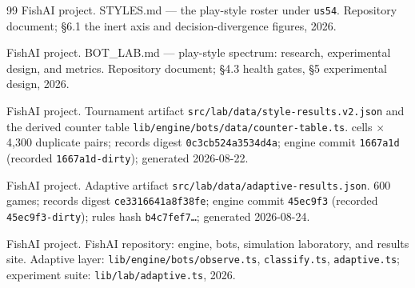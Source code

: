 \documentclass[11pt]{article}
\newcommand{\code}[1]{\texttt{#1}}
\newcommand{\usff}{\code{us54}}
\begin{document}
\begin{thebibliography}{99}
FishAI project.
\newblock STYLES.md --- the play-style roster under \usff{}.
\newblock Repository document; \S6.1 the inert axis and decision-divergence figures, 2026.

FishAI project.
\newblock BOT\_LAB.md --- play-style spectrum: research, experimental design, and metrics.
\newblock Repository document; \S4.3 health gates, \S5 experimental design, 2026.

FishAI project.
\newblock Tournament artifact \code{src/lab/data/style-results.v2.json} and the derived
counter table \code{lib/engine/bots/data/counter-table.ts}.
 cells $\times$ 4{,}300 duplicate pairs; records digest
\code{0c3cb524a3534d4a}; engine commit \code{1667a1d} (recorded \code{1667a1d-dirty});
generated 2026-08-22.

FishAI project.
\newblock Adaptive artifact \code{src/lab/data/adaptive-results.json}.
600 games; records digest \code{ce3316641a8f38fe}; engine commit
\code{45ec9f3} (recorded \code{45ec9f3-dirty}); rules hash \code{b4c7fef7\ldots};
generated 2026-08-24.

FishAI project.
\newblock FishAI repository: engine, bots, simulation laboratory, and results site.
\newblock Adaptive layer: \code{lib/engine/bots/observe.ts}, \code{classify.ts},
\code{adaptive.ts}; experiment suite: \code{lib/lab/adaptive.ts}, 2026.

\end{thebibliography}
\end{document}
